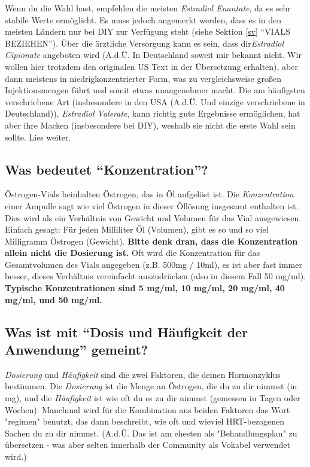 \documentclass{article}
\begin{document}
Wenn du die Wahl hast, empfehlen die meisten \textit{Estradiol Enantate}, da es sehr stabile Werte ermöglicht. Es muss jedoch angemerkt werden, dass es in den meisten Ländern nur bei DIY zur Verfügung steht (siehe Sektion \ref{sv} “VIALS BEZIEHEN”). Über die ärztliche Versorgung kann es sein, dass dir\textit{Estradiol Cipionate} angeboten wird (A.d.Ü. In Deutschland soweit mir bekannt nicht. Wir wollen hier trotzdem den originalen US Text in der Übersetzung erhalten), aber dann meistens in niedrigkonzentrierter Form, was zu vergleichsweise großen Injektionsmengen führt und somit etwas unangenehmer macht. Die am häufigsten verschriebene Art (insbesondere in den USA (A.d.Ü. Und einzige verschriebene in Deutschland)), \textit{Estradiol Valerate}, kann richtig gute Ergebnisse ermöglichen, hat aber ihre Macken (insbesondere bei DIY), weshalb sie nicht die erste Wahl sein sollte. Lies weiter.

\subsection{Was bedeutet “Konzentration”?}

Östrogen-Vials beinhalten Östrogen, das in Öl aufgelöst ist. Die \textit{Konzentration} einer Ampulle sagt wie viel Östrogen in dieser Öllösung insgesamt enthalten ist. Dies wird als ein Verhältnis von Gewicht und Volumen für das Vial ausgewiesen. Einfach gesagt: Für jeden Milliliter Öl (Volumen), gibt es so und so viel Milligramm Östrogen (Gewicht). \textbf{Bitte denk dran, dass die Konzentration allein nicht die Dosierung ist.} Oft wird die Konzentration für das Gesamtvolumen des Vials angegeben (z.B. 500mg / 10ml), es ist aber fast immer besser, dieses Verhältnis vereinfacht auszudrücken (also in diesem Fall 50 mg/ml). \textbf{Typische Konzentrationen sind 5 mg/ml, 10 mg/ml, 20 mg/ml, 40 mg/ml, und 50 mg/ml.}

\subsection{Was ist mit “Dosis und Häufigkeit der Anwendung” gemeint?}

\textit{Dosierung} und \textit{Häufigkeit} sind die zwei Faktoren, die deinen Hormonzyklus bestimmen. Die \textit{Dosierung} ist die Menge an Östrogen, die du zu dir nimmst (in mg), und die \textit{Häufigkeit} ist wie oft du es zu dir nimmst (gemessen in Tagen oder Wochen). Manchmal wird für die Kombination aus beiden Faktoren das Wort "regimen" benutzt, das dann beschreibt, wie oft und wieviel HRT-bezogenen Sachen du zu dir nimmst. (A.d.Ü. 
 Das ist am ehesten als "Behandlungsplan" zu übersetzen - was aber selten innerhalb der Community als Vokabel verwendet wird.)
\end{document}
